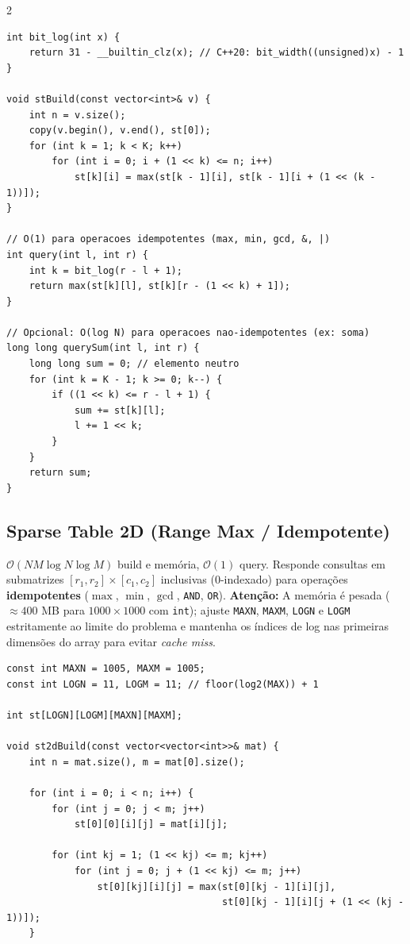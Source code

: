 \documentclass[11pt]{article}
\begin{document}
\begin{multicols}{2}
\begin{lstlisting}
int bit_log(int x) {
    return 31 - __builtin_clz(x); // C++20: bit_width((unsigned)x) - 1
}

void stBuild(const vector<int>& v) {
    int n = v.size();
    copy(v.begin(), v.end(), st[0]);
    for (int k = 1; k < K; k++)
        for (int i = 0; i + (1 << k) <= n; i++)
            st[k][i] = max(st[k - 1][i], st[k - 1][i + (1 << (k - 1))]);
}

// O(1) para operacoes idempotentes (max, min, gcd, &, |)
int query(int l, int r) {
    int k = bit_log(r - l + 1);
    return max(st[k][l], st[k][r - (1 << k) + 1]);
}

// Opcional: O(log N) para operacoes nao-idempotentes (ex: soma)
long long querySum(int l, int r) {
    long long sum = 0; // elemento neutro
    for (int k = K - 1; k >= 0; k--) {
        if ((1 << k) <= r - l + 1) {
            sum += st[k][l];
            l += 1 << k;
        }
    }
    return sum;
}
\end{lstlisting}

\subsection{Sparse Table 2D (Range Max / Idempotente)}
$\mathcal{O}(NM \log N \log M)$ build e memória, $\mathcal{O}(1)$ query. Responde consultas em submatrizes $[r_1, r_2] \times [c_1, c_2]$ inclusivas (0-indexado) para operações \textbf{idempotentes} ($\max$, $\min$, $\gcd$, \texttt{AND}, \texttt{OR}). \textbf{Atenção:} A memória é pesada ($\approx 400$ MB para $1000 \times 1000$ com \texttt{int}); ajuste \texttt{MAXN}, \texttt{MAXM}, \texttt{LOGN} e \texttt{LOGM} estritamente ao limite do problema e mantenha os índices de log nas primeiras dimensões do array para evitar \textit{cache miss}.
\begin{lstlisting}
const int MAXN = 1005, MAXM = 1005;
const int LOGN = 11, LOGM = 11; // floor(log2(MAX)) + 1

int st[LOGN][LOGM][MAXN][MAXM];

void st2dBuild(const vector<vector<int>>& mat) {
    int n = mat.size(), m = mat[0].size();

    for (int i = 0; i < n; i++) {
        for (int j = 0; j < m; j++)
            st[0][0][i][j] = mat[i][j];

        for (int kj = 1; (1 << kj) <= m; kj++)
            for (int j = 0; j + (1 << kj) <= m; j++)
                st[0][kj][i][j] = max(st[0][kj - 1][i][j],
                                      st[0][kj - 1][i][j + (1 << (kj - 1))]);
    }


\end{lstlisting}
\end{multicols}
\end{document}
